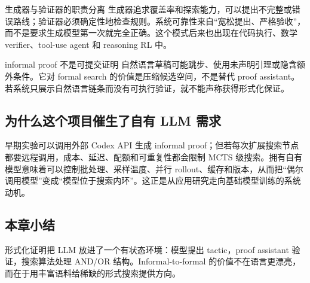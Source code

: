 
\begin{importantbox}{生成器与验证器的职责分离}
生成器追求覆盖率和探索能力，可以提出不完整或错误路线；验证器必须确定性地检查规则。系统可靠性来自“宽松提出、严格验收”，而不是要求生成模型第一次就完全正确。这个模式后来也出现在代码执行、数学 verifier、tool-use agent 和 reasoning RL 中。
\end{importantbox}

\begin{warningbox}{informal proof 不是可提交证明}
自然语言草稿可能跳步、使用未声明引理或隐含额外条件。它对 formal search 的价值是压缩候选空间，不是替代 proof assistant。若系统只展示自然语言链条而没有可执行验证，就不能声称获得形式化保证。
\end{warningbox}


\subsection{为什么这个项目催生了自有 LLM 需求}

早期实验可以调用外部 Codex API 生成 informal proof；但若每次扩展搜索节点都要远程调用，成本、延迟、配额和可重复性都会限制 MCTS 级搜索。拥有自有模型意味着可以控制批处理、采样温度、并行 rollout、缓存和版本，从而把“偶尔调用模型”变成“模型位于搜索内环”。这正是从应用研究走向基础模型训练的系统动机。

\subsection{本章小结}

形式化证明把 LLM 放进了一个有状态环境：模型提出 tactic，proof assistant 验证，搜索算法处理 AND/OR 结构。Informal-to-formal 的价值不在语言更漂亮，而在于用丰富语料给稀缺的形式搜索提供方向。

